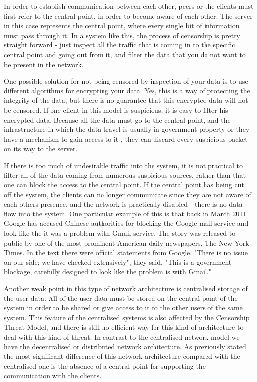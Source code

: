 In order to establish communication between each other, peers or the clients must first refer to the central point, in order to become aware of each other. The server in this case represents the central point, where every single bit of information must pass through it. In a system like this, the process of censorship is pretty straight forward - just inspect all the traffic that is coming in to the specific central point and going out from it, and filter the data that you do not want to be present in the network. 

One possible solution for not being censored by inspection of your data is to use different algorithms for encrypting your data. Yes, this is a way of protecting the integrity of the data, but there is no guarantee that this encrypted data will not be censored. If one client in this model is suspicious, it is easy to filter his encrypted data. Because all the data must go to the central point, and the infrastructure in which the data travel is usually in government property or they have a mechanism to gain access to it \cite{dianotti2011}, they can discard every suspicious packet on its way to the server.

If there is too much of undesirable traffic into the system, it is not practical to filter all of the data coming from numerous suspicious sources, rather than that one can block the access to the central point. If the central point has being cut off the system, the clients can no longer communicate since they are not aware of each others presence, and the network is practically disabled - there is no data flow into the system. One particular example of this is that back in March 2011 Google has accused Chinese authorities for blocking the Google mail service and look like the it was a problem with Gmail service. The story was released to public by one of the most prominent American daily newspapers, The New York Times. In the text there were official statements from Google. "There is no issue on our side; we have checked extensively", they said. "This is a government blockage, carefully designed to look like the problem is with Gmail." \cite{web:newyorktimes}

Another weak point in this type of network architecture is centralised storage of the user data. All of the user data must be stored on the central point of the system in order to be shared or give access to it to the other users of the same system. This feature of the centralised systems is also affected by the Censorship Threat Model, and there is still no efficient way for this kind of architecture to deal with this kind of threat.
In contrast to the centralised network model we have the decentralised or distributed network architecture. As previously stated the most significant difference of this network architecture compared with the centralised one is the absence of a central point for supporting the communication with the clients. 

